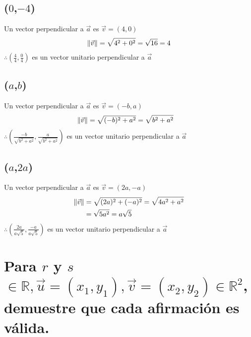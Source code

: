 \documentclass[14pt]{extarticle}
\DeclarePairedDelimiter\norm{\lVert}{\rVert}%
\begin{document}
    \subsection{($0$,$-4$)}
        Un vector perpendicular a $\vec{a}$ es $\vec{v} = (4,0)$
        \begin{align}
            \notag \norm{\vec{v}} = \sqrt{4^2+0^2} = \sqrt{16} = 4
        \end{align}
         $\therefore \left(\frac{4}{4}, \frac{0}{4}\right)$ es un vector unitario perpendicular a $\vec{a}$
    \subsection{($a$,$b$)}
        Un vector perpendicular a $\vec{a}$ es $\vec{v} = (-b,a)$
        \begin{align}
            \notag \norm{\vec{v}} &= \sqrt{(-b)^2+a^2} = \sqrt{b^2+a^2}
         \end{align}
        $\therefore \left(\frac{-b}{\sqrt{b^2+a^2}}, \frac{a}{\sqrt{b^2+a^2}}\right)$ es un vector unitario perpendicular a $\vec{a}$
    \subsection{($a$,$2a$)}
         Un vector perpendicular a $\vec{a}$ es $\vec{v} = (2a,-a)$
        \begin{align}
            \notag \norm{\vec{v}} &= \sqrt{(2a)^2+(-a)^2} = \sqrt{4a^2+a^2} \\
            \notag &= \sqrt{5a^2} = a\sqrt{5}
         \end{align}
        $\therefore \left(\frac{2a}{a\sqrt{5}}, \frac{-a}{a\sqrt{5}}\right)$ es un vector unitario perpendicular a $\vec{a}$
\section{Para $r$ y $s$ $\in \mathbb{R}, \vec{u} = (x_1,y_1), \vec{v} = (x_2,y_2) \in \mathbb{R}^2$,  demuestre que cada afirmación es válida.}
\end{document}
